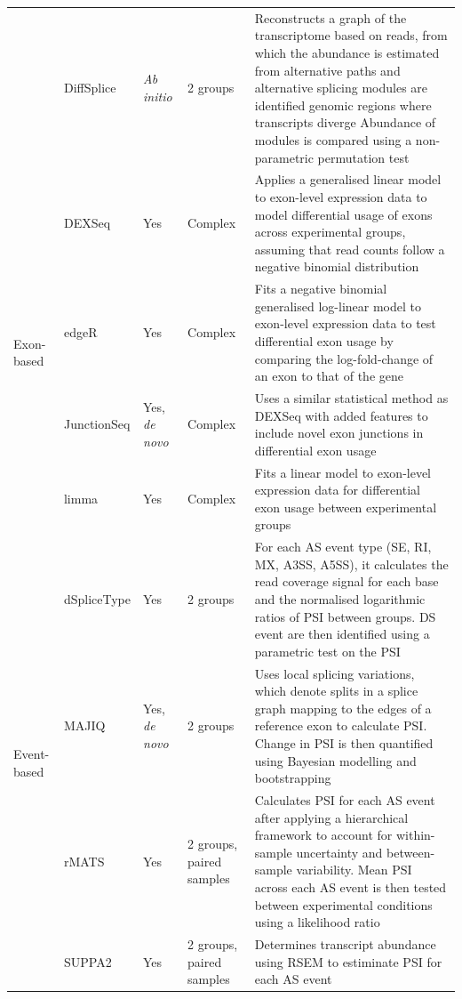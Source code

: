 \begin{changemargin}{1.5cm}
\begin{landscape}
\begin{longtable}[c]{p{2.5cm}p{2cm}p{2cm}p{2.5cm}p{17cm}}
		&
		DiffSplice &
		\textit{Ab initio} &
		2 groups &
		\tabitem Reconstructs a graph of the transcriptome based on reads, from   which the abundance is estimated from alternative paths and alternative splicing modules are identified genomic regions where transcripts diverge \newline 
		\tabitem  Abundance of modules is compared using a non-parametric permutation test \\ \cmidrule(l){1-5} 
		\multirow{4}{*}{Exon-based} &
		DEXSeq &
		Yes &
		Complex &
		\tabitem Applies a generalised linear model to exon-level expression data to model differential usage of exons across experimental groups, assuming that read counts follow a negative binomial distribution \\ 		
		&
		edgeR &
		Yes &
		Complex &
		\tabitem Fits a negative binomial generalised log-linear model to exon-level expression data  to test differential exon usage by comparing the log-fold-change of an exon to that of the gene \\
		&
		JunctionSeq &
		Yes, \textit{de novo} &
		Complex &
		\tabitem Uses a similar statistical method as DEXSeq with added features to include novel exon junctions in differential exon usage \\	
		&
		limma &
		Yes &
		Complex &
		\tabitem Fits a linear model to exon-level expression data for differential exon usage between experimental groups \\ \cmidrule(l){1-5} 
		\multirow{4}{*}{Event-based} &
		dSpliceType &
		Yes &
		2 groups &
		\tabitem For each AS event type (SE, RI, MX, A3SS, A5SS), it calculates the read coverage signal for each base and the normalised  logarithmic ratios of PSI between groups. DS event are then identified using a parametric test on the PSI \\ 			
		& 
		MAJIQ &
		Yes, \textit{de novo} &
		2 groups &
		\tabitem Uses local splicing variations, which denote splits in a splice graph mapping to the edges of a reference exon to calculate PSI.   
		\tabitem Change in PSI is then quantified using Bayesian modelling and bootstrapping \\ 		

		&
		rMATS &
		Yes &
		2 groups, \newline paired samples &
		\tabitem Calculates PSI for each AS event after applying a hierarchical framework to account for within-sample uncertainty and between-sample variability.
		\tabitem Mean PSI across each AS event is then tested between experimental conditions using a likelihood ratio \\ 	
		&
		SUPPA2 &
		Yes &
		2 groups, \newline paired samples &
		\tabitem Determines transcript abundance using RSEM to estiminate PSI   for each AS event \\* \bottomrule 
		\end{longtable}
\end{landscape}
\end{changemargin}

